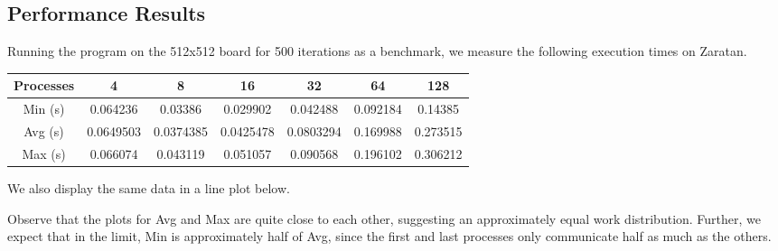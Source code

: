 \documentclass{article}
\begin{document}
  \subsection*{Performance Results}
  Running the program on the 512x512 board for 500 iterations as a benchmark, we measure the following execution times on Zaratan.
  \begin{center}
    \begin{tabular}{ |c|c|c|c|c|c|c| }
      \hline
      Processes & 4 & 8 & 16 & 32 & 64 & 128 \\
      \hline
      Min (s) & 0.064236 & 0.03386 & 0.029902 & 0.042488 & 0.092184 & 0.14385 \\
      \hline
      Avg (s) & 0.0649503 & 0.0374385 & 0.0425478 & 0.0803294 & 0.169988 & 0.273515 \\
      \hline
      Max (s) & 0.066074 & 0.043119 & 0.051057 & 0.090568 & 0.196102 & 0.306212 \\
      \hline
     \end{tabular}
  \end{center}
  We also display the same data in a line plot below.
  \begin{center}
  \end{center}
  Observe that the plots for Avg and Max are quite close to each other, suggesting an approximately equal work distribution. Further, we expect that in the limit, Min is approximately half of Avg, since the first and last processes only communicate half as much as the others.
\end{document}
